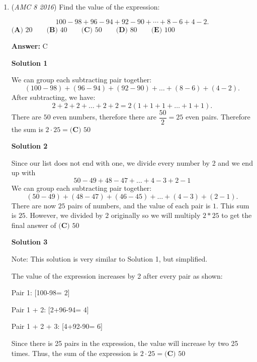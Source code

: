 \begin{enumerate}
Any even integer $m$ can be divided into $2n$ where $n$ is an integer as well. Therefore, $\textbf{(A), (C),}$ and $\textbf{(E)}$ are immediately disqualified, as when $m$ is even, $a^m$ can always be written as $(a^\frac{m}{2})^2$ as $(a^m)^n = a^{mn}$ and vice versa. Only odd exponents are non-squares, therefore. $4=2^2$, which means $4^{2019}=(2^2)^2019=(2^{2019})^2$ by the $(a^m)^n = a^{mn}$ rule. The only option left is $\boxed{\textbf{(B) }2^{2017}}$.

 


	\item (\textit{AMC 8 2016}) Find the value of the expression:

 \[100-98+96-94+92-90+\cdots+8-6+4-2.\]$\textbf{(A) }20\qquad\textbf{(B) }40\qquad\textbf{(C) }50\qquad\textbf{(D) }80\qquad \textbf{(E) }100$

 \textbf{Answer: }C



\textbf{Solution 1}

We can group each subtracting pair together:
 \[(100-98)+(96-94)+(92-90)+ \ldots +(8-6)+(4-2).\]After subtracting, we have:
 \[2+2+2+\ldots+2+2=2(1+1+1+\ldots+1+1).\]There are $50$ even numbers, therefore there are $\dfrac{50}{2}=25$ even pairs. Therefore the sum is $2 \cdot 25=\boxed{\textbf{(C) }50}$




\textbf{Solution 2}

Since our list does not end with one, we divide every number by 2 and we end up with
 \[50-49+48-47+ \ldots +4-3+2-1\]We can group each subtracting pair together:
 \[(50-49)+(48-47)+(46-45)+ \ldots +(4-3)+(2-1).\]There are now $25$ pairs of numbers, and the value of each pair is $1$.  This sum is $25$. However, we divided by $2$ originally so we will multiply $2*25$ to get the final answer of $\boxed{\textbf{(C) }50}$




\textbf{Solution 3}

Note: This solution is very similar to Solution 1, but simplified.

 The value of the expression increases by 2 after every pair as shown:

 Pair 1: [100-98= $2$]

 Pair 1 + 2: [2+96-94= $4$]

 Pair 1 + 2 + 3: [4+92-90= $6$]

 Since there is 25 pairs in the expression, the value will increase by two 25 times. Thus, the sum of the expression is  $2 \cdot 25=\boxed{\textbf{(C) }50}$





\end{enumerate}
